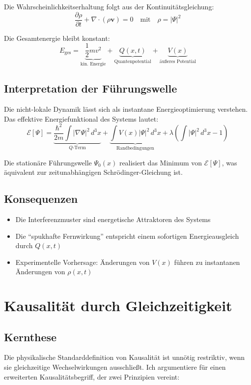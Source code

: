 Die Wahrscheinlichkeitserhaltung folgt aus der Kontinuitätsgleichung:
\[ \frac{\partial\rho}{\partial t} + \nabla\cdot(\rho\mathbf{v}) = 0 \quad \text{mit} \quad \rho = |\Psi|^2 \]

Die Gesamtenergie bleibt konstant:
\[ E_{\text{ges}} = \underbrace{\frac{1}{2}mv^2}_{\text{kin. Energie}} + \underbrace{Q(x,t)}_{\text{Quantenpotential}} + \underbrace{V(x)}_{\text{äußeres Potential}} \]

\subsection{Interpretation der Führungswelle}

Die nicht-lokale Dynamik lässt sich als instantane Energieoptimierung verstehen. Das effektive Energiefunktional des Systems lautet:
\[ \mathcal{E}[\Psi] = \underbrace{\frac{\hbar^2}{2m}\int|\nabla\Psi|^2\,d^3x}_{Q\text{-Term}} + \underbrace{\int V(x)|\Psi|^2\,d^3x}_{\text{Randbedingungen}} + \lambda\left(\int|\Psi|^2\,d^3x - 1\right) \]

Die stationäre Führungswelle $\Psi_0(x)$ realisiert das Minimum von $\mathcal{E}[\Psi]$, was äquivalent zur zeitunabhängigen Schrödinger-Gleichung ist.

\subsection{Konsequenzen}

\begin{itemize}
\item Die Interferenzmuster sind energetische Attraktoren des Systems
\item Die \enquote{spukhafte Fernwirkung} entspricht einem sofortigen Energieausgleich durch $Q(x,t)$
\item Experimentelle Vorhersage: Änderungen von $V(x)$ führen zu instantanen Änderungen von $\rho(x,t)$
\end{itemize}

\section{Kausalität durch Gleichzeitigkeit}
\label{sec:gleichzeitige_kausalitaet}

\subsection{Kernthese}
Die physikalische Standarddefinition von Kausalität ist unnötig restriktiv, wenn sie gleichzeitige Wechselwirkungen ausschließt. Ich argumentiere für einen erweiterten Kausalitätsbegriff, der zwei Prinzipien vereint:

